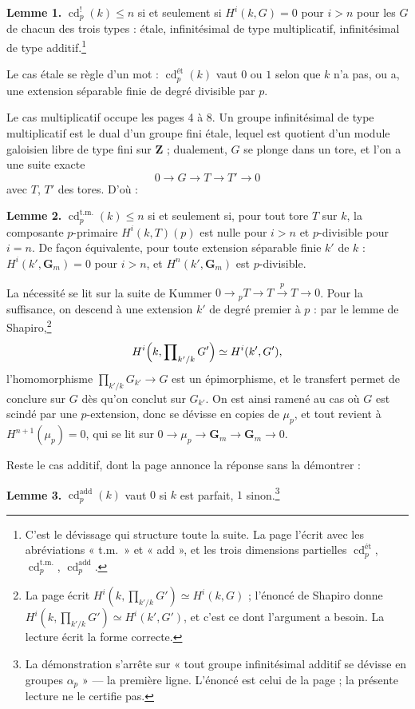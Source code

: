 \documentclass[11pt,a4paper]{article}
\begin{document}
\textbf{Lemme 1.} $\operatorname{cd}^{!}_p(k) \leqslant n$ si et seulement si
$H^i(k,G) = 0$ pour $i > n$ pour les $G$ de chacun des trois types : étale,
infinitésimal de type multiplicatif, infinitésimal de type
additif.\footnote{C'est le dévissage qui structure toute la suite. La page
l'écrit avec les abréviations « t.m.\ » et « add », et les trois dimensions
partielles $\operatorname{cd}^{\text{ét}}_p$,
$\operatorname{cd}^{\mathrm{t.m.}}_p$, $\operatorname{cd}^{\mathrm{add}}_p$.}

Le cas étale se règle d'un mot : $\operatorname{cd}^{\text{ét}}_p(k)$ vaut $0$
ou $1$ selon que $k$ n'a pas, ou a, une extension séparable finie de degré
divisible par $p$.

Le cas multiplicatif occupe les pages 4 à 8. Un groupe infinitésimal de type
multiplicatif est le dual d'un groupe fini étale, lequel est quotient d'un
module galoisien libre de type fini sur $\mathbf{Z}$ ; dualement, $G$ se plonge
dans un tore, et l'on a une suite exacte
\[
0 \longrightarrow G \longrightarrow T \longrightarrow T' \longrightarrow 0
\]
avec $T$, $T'$ des tores. D'où :

\textbf{Lemme 2.} $\operatorname{cd}^{\mathrm{t.m.}}_p(k) \leqslant n$ si et
seulement si, pour tout tore $T$ sur $k$, la composante $p$-primaire
$H^i(k,T)(p)$ est nulle pour $i > n$ et $p$-divisible pour $i = n$.
De façon équivalente, pour toute extension séparable finie $k'$ de $k$ :
$H^i(k', \mathbf{G}_m) = 0$ pour $i > n$, et $H^n(k', \mathbf{G}_m)$ est
$p$-divisible.

La nécessité se lit sur la suite de Kummer
$0 \to {}_pT \to T \xrightarrow{p} T \to 0$. Pour la suffisance, on descend à
une extension $k'$ de degré premier à $p$ : par le lemme de
Shapiro,\footnote{La page écrit $H^i(k, \prod_{k'/k} G') \simeq H^i(k,G)$ ;
l'énoncé de Shapiro donne $H^i(k, \prod_{k'/k} G') \simeq H^i(k', G')$, et
c'est ce dont l'argument a besoin. La lecture écrit la forme correcte.}
\[
H^i\Bigl(k, \prod\nolimits_{k'/k} G'\Bigr) \simeq H^i(k', G'),
\]
l'homomorphisme $\prod_{k'/k} G_{k'} \to G$ est un épimorphisme, et le
transfert permet de conclure sur $G$ dès qu'on conclut sur $G_{k'}$. On est
ainsi ramené au cas où $G$ est scindé par une $p$-extension, donc se dévisse en
copies de $\mu_p$, et tout revient à $H^{n+1}(\mu_p) = 0$, qui se lit sur
$0 \to \mu_p \to \mathbf{G}_m \to \mathbf{G}_m \to 0$.

Reste le cas additif, dont la page annonce la réponse sans la démontrer :

\textbf{Lemme 3.} $\operatorname{cd}^{\mathrm{add}}_p(k)$ vaut $0$ si $k$ est
parfait, $1$ sinon.\footnote{La démonstration s'arrête sur « tout groupe
infinitésimal additif se dévisse en groupes $\alpha_p$ » — la première ligne.
L'énoncé est celui de la page ; la présente lecture ne le certifie pas.}
\end{document}
